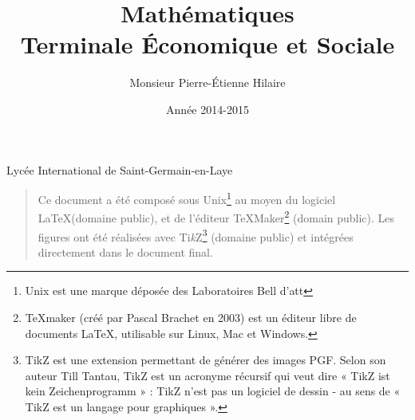 
\usepackage[T1]{fontenc} 
\usepackage[a4paper,left=2cm,right=2cm,top=2cm,bottom=2cm]{geometry} 
\usepackage{lmodern} 
\usepackage{graphicx} 
\usepackage{fancyhdr}


\usepackage{textcomp}
\usepackage{texgraph}
\usepackage{pgf,tikz}
\usetikzlibrary{arrows}

\usepackage{variations}

\newcommand*{\OUVRAGE}{}%


\title {  \Huge     Mathématiques\\
             Terminale Économique et Sociale \\
       }

\author{ \Large   Monsieur Pierre-Étienne Hilaire  }

\date  { \large  Année 2014-2015   }





\maketitle\thispagestyle{empty} %
\vfill

\centerline {\large  Lycée International de Saint-Germain-en-Laye} 

\newpage

\thispagestyle{empty}

\def\TikZ{{\fontfamily{cmr}Ti{\em k}Z}} 
    \begin {quote}
    Ce document a été composé sous  Unix\footnote{Unix  est une
    marque déposée des  Laboratoires  Bell d'{\sc att}} au moyen  
    du logiciel \LaTeX (domaine  public),
    et de l'éditeur {\TeX}{Maker}\footnote{TeXmaker (créé par Pascal Brachet en 2003) est un éditeur libre de documents LaTeX, utilisable sur Linux, Mac et Windows.} (domain public). 
    Les figures ont été réalisées avec {\TikZ}\footnote{TikZ est une extension permettant de générer des images PGF. Selon son auteur Till Tantau, TikZ est un acronyme récursif qui veut dire « TikZ ist kein Zeichenprogramm » : TikZ n'est pas un logiciel de dessin - au sens de « TikZ est un langage pour graphiques ».} (domaine
   public)  et  intégrées  directement  dans le  document  final.
    \end {quote}

